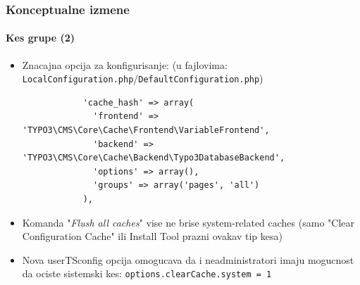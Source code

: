 \begin{frame}[fragile]
	\frametitle{Konceptualne izmene}
	\framesubtitle{Kes grupe (2)}

	\lstset{
		basicstyle=\tiny\ttfamily
	}

	\begin{itemize}

		\item Znacajna opcija za konfigurisanje:\newline
			\smaller(u fajlovima: \texttt{LocalConfiguration.php}/\texttt{DefaultConfiguration.php})\normalsize

			\begin{lstlisting}
			'cache_hash' => array(
			  'frontend' => 'TYPO3\CMS\Core\Cache\Frontend\VariableFrontend',
			  'backend' => 'TYPO3\CMS\Core\Cache\Backend\Typo3DatabaseBackend',
			  'options' => array(),
			  'groups' => array('pages', 'all')
			),
			\end{lstlisting}

		\item Komanda "\textit{Flush all caches}" vise ne brise system-related caches
			(samo "Clear Configuration Cache" ili Install Tool prazni ovakav tip kesa)
		\item Nova userTSconfig opcija omogucava da i neadministratori imaju mogucnost da ociste sistemski kes:\newline
			\smaller\texttt{options.clearCache.system = 1}\normalsize

		\breakingchange

	\end{itemize}

\end{frame}


